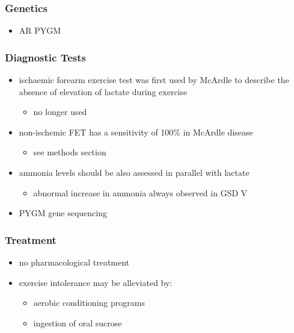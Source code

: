 \documentclass{scrartcl}
\begin{document}
\subsubsection{Genetics}
\label{sec:orgd207a3b}
\begin{itemize}
\item AR PYGM
\end{itemize}

\subsubsection{Diagnostic Tests}
\label{sec:org0d90f1f}
\begin{itemize}
\item ischaemic forearm exercise test was first used by McArdle to
describe the absence of elevation of lactate during exercise
\begin{itemize}
\item no longer used
\end{itemize}
\item non-ischemic FET has a sensitivity of 100\% in McArdle disease
\begin{itemize}
\item see methods section
\end{itemize}
\item ammonia levels should be also assessed in parallel with lactate
\begin{itemize}
\item abnormal increase in ammonia always observed in GSD V
\end{itemize}
\item PYGM gene sequencing
\end{itemize}

\subsubsection{Treatment}
\label{sec:orgc812869}
\begin{itemize}
\item no pharmacological treatment
\item exercise intolerance may be alleviated by:
\begin{itemize}
\item aerobic conditioning programs
\item ingestion of oral sucrose
\end{itemize}
\end{itemize}
\end{document}
